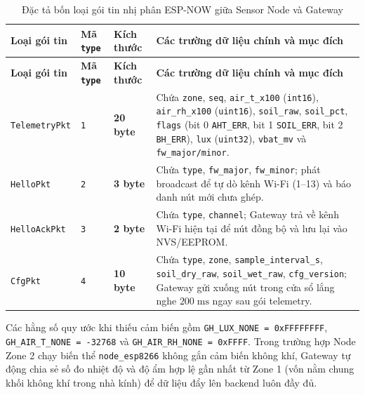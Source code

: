 \begingroup
\footnotesize
\setlength{\tabcolsep}{3.5pt}
\renewcommand{\arraystretch}{1.12}
\begin{longtable}{|>{\raggedright\arraybackslash}p{}|>{\centering\arraybackslash}p{}|>{\centering\arraybackslash}p{}|>{\raggedright\arraybackslash}p{}|}
\caption{Đặc tả bốn loại gói tin nhị phân ESP-NOW giữa Sensor Node và Gateway}\label{tab:espnow-packets}\\
\hline
\textbf{Loại gói tin} & \textbf{Mã \texttt{type}} & \textbf{Kích thước} & \textbf{Các trường dữ liệu chính và mục đích} \\
\hline
\endfirsthead
\hline
\textbf{Loại gói tin} & \textbf{Mã \texttt{type}} & \textbf{Kích thước} & \textbf{Các trường dữ liệu chính và mục đích} \\
\hline
\endhead
\texttt{TelemetryPkt} & \texttt{1} & \textbf{20 byte} & Chứa \texttt{zone}, \texttt{seq}, \texttt{air\_t\_x100} (\texttt{int16}), \texttt{air\_rh\_x100} (\texttt{uint16}), \texttt{soil\_raw}, \texttt{soil\_pct}, \texttt{flags} (bit 0 \texttt{AHT\_ERR}, bit 1 \texttt{SOIL\_ERR}, bit 2 \texttt{BH\_ERR}), \texttt{lux} (\texttt{uint32}), \texttt{vbat\_mv} và \texttt{fw\_major/minor}. \\
\hline
\texttt{HelloPkt} & \texttt{2} & \textbf{3 byte} & Chứa \texttt{type}, \texttt{fw\_major}, \texttt{fw\_minor}; phát broadcast để tự dò kênh Wi-Fi (1--13) và báo danh nút mới chưa ghép. \\
\hline
\texttt{HelloAckPkt} & \texttt{3} & \textbf{2 byte} & Chứa \texttt{type}, \texttt{channel}; Gateway trả về kênh Wi-Fi hiện tại để nút đồng bộ và lưu lại vào NVS/EEPROM. \\
\hline
\texttt{CfgPkt} & \texttt{4} & \textbf{10 byte} & Chứa \texttt{type}, \texttt{zone}, \texttt{sample\_interval\_s}, \texttt{soil\_dry\_raw}, \texttt{soil\_wet\_raw}, \texttt{cfg\_version}; Gateway gửi xuống nút trong cửa sổ lắng nghe \(200\;\text{ms}\) ngay sau gói telemetry. \\
\hline
\end{longtable}
\endgroup

Các hằng số quy ước khi thiếu cảm biến gồm \texttt{GH\_LUX\_NONE = 0xFFFFFFFF}, \texttt{GH\_AIR\_T\_NONE = -32768} và \texttt{GH\_AIR\_RH\_NONE = 0xFFFF}. Trong trường hợp Node Zone 2 chạy biến thể \texttt{node\_esp8266} không gắn cảm biến không khí, Gateway tự động chia sẻ số đo nhiệt độ và độ ẩm hợp lệ gần nhất từ Zone 1 (vốn nằm chung khối không khí trong nhà kính) để dữ liệu đẩy lên backend luôn đầy đủ.

